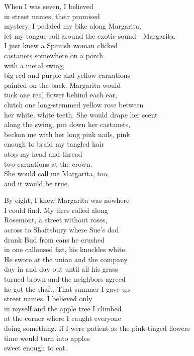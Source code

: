 \documentclass[twoside,10pt]{book}
\begin{document}
When I was seven, I believed\\
in street names, their promised\\
mystery. I pedaled my bike along Margarita,\\
let my tongue roll around the exotic sound---Margarita.\\
I just knew a Spanish woman clicked\\
castanets somewhere on a porch\\
with a metal swing,\\
big red and purple and yellow carnations\\
painted on the back. Margarita would\\
tuck one real flower behind each ear,\\
clutch one long-stemmed yellow rose between\\
her white, white teeth. She would drape her scent\\
along the swing, put down her castanets,\\
beckon me with her long pink nails, pink\\
enough to braid my tangled hair\\
atop my head and thread\\
two carnations at the crown.\\
She would call me Margarita, too,\\
and it would be true.

By eight, I knew Margarita was nowhere\\
I could find. My tires rolled along\\
Rosemont, a street without roses,\\
across to Shaftsbury where Sue's dad\\
drank Bud from cans he crushed\\
in one calloused fist, his knuckles white.\\
He swore at the union and the company\\
day in and day out until all his grass\\
turned brown and the neighbors agreed\\
he got the shaft. That summer I gave up\\
street names. I believed only\\
in myself and the apple tree I climbed\\
at the corner where I caught everyone\\
doing something.
\clearpage
If I were patient as the pink-tinged flowers\\
time would turn into apples\\
sweet enough to eat.
\end{document}
